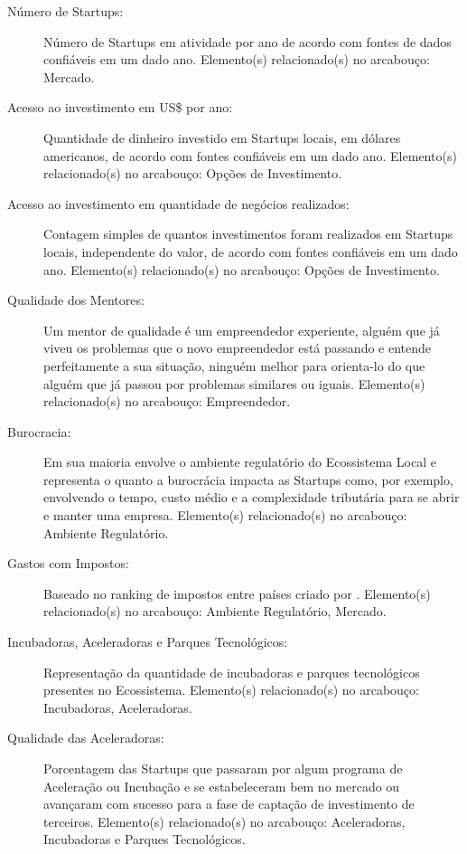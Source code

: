 \begin{description}
  \item [Número de Startups:] Número de Startups em atividade por ano de acordo com fontes de dados confiáveis em um dado ano. Elemento(s) relacionado(s) no arcabouço: Mercado.

  \item [Acesso ao investimento em US\$ por ano:] Quantidade de dinheiro investido em Startups locais, em dólares americanos, de acordo com fontes confiáveis em um dado ano. Elemento(s) relacionado(s) no arcabouço: Opções de Investimento. 

  \item [Acesso ao investimento em quantidade de negócios realizados:] Contagem simples de quantos investimentos foram realizados em Startups locais, independente do valor, de acordo com fontes confiáveis em um dado ano. Elemento(s) relacionado(s) no arcabouço: Opções de Investimento.

  \item [Qualidade dos Mentores:] Um mentor de qualidade é um empreendedor experiente, alguém que já viveu os problemas que o novo empreendedor está passando e entende perfeitamente a sua situação, ninguém melhor para orienta-lo do que alguém que já passou por problemas similares ou iguais. Elemento(s) relacionado(s) no arcabouço: Empreendedor.

  \item [Burocracia:] Em sua maioria envolve o ambiente regulatório do Ecossistema Local e representa o quanto a burocrácia impacta as Startups como, por exemplo, envolvendo o tempo, custo médio e a complexidade tributária para se abrir e manter uma empresa. Elemento(s) relacionado(s) no arcabouço: Ambiente Regulatório.

  \item [Gastos com Impostos:] Baseado no ranking de impostos entre países criado por . Elemento(s) relacionado(s) no arcabouço: Ambiente Regulatório, Mercado. 

  \item [Incubadoras, Aceleradoras e Parques Tecnológicos:] Representação da quantidade de incubadoras e parques tecnológicos presentes no Ecossistema. Elemento(s) relacionado(s) no arcabouço: Incubadoras, Aceleradoras.

  \item [Qualidade das Aceleradoras:] Porcentagem das Startups que passaram por algum programa de Aceleração ou Incubação e se estabeleceram bem no mercado ou avançaram com sucesso para a fase de captação de investimento de terceiros. Elemento(s) relacionado(s) no arcabouço: Aceleradoras, Incubadoras e Parques Tecnológicos.


\end{description}
